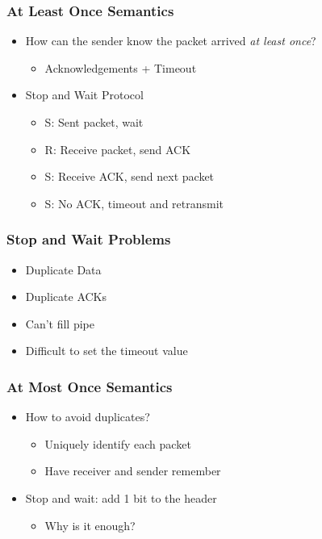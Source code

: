 \subsubsection{At Least Once Semantics}
\begin{itemize}[nosep]
    \item How can the sender know the packet arrived \emph{at least once}?
          \begin{itemize}[nosep]
              \item Acknowledgements + Timeout
          \end{itemize}
    \item Stop and Wait Protocol
          \begin{itemize}[nosep]
              \item S: Sent packet, wait
              \item R: Receive packet, send ACK
              \item S: Receive ACK, send next packet
              \item S: No ACK, timeout and retransmit
          \end{itemize}
\end{itemize}

\subsubsection{Stop and Wait Problems}
\begin{itemize}[nosep]
    \item Duplicate Data
    \item Duplicate ACKs
    \item Can't fill pipe
    \item Difficult to set the timeout value
\end{itemize}

\subsubsection{At Most Once Semantics}
\begin{itemize}[nosep]
    \item How to avoid duplicates?
          \begin{itemize}[nosep]
              \item Uniquely identify each packet
              \item Have receiver and sender remember
          \end{itemize}
    \item Stop and wait: add 1 bit to the header
          \begin{itemize}[nosep]
              \item Why is it enough?
          \end{itemize}
\end{itemize}

